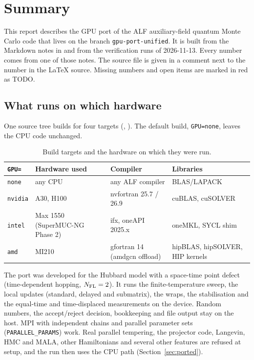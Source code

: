 \section{Summary}

This report describes the GPU port of the ALF auxiliary-field quantum Monte Carlo code that lives on the branch \texttt{gpu-port-unified}. It is built from the Markdown notes in  and from the verification runs of 2026-11-13. Every number comes from one of those notes. The source file is given in a comment next to the number in the \LaTeX{} source. Missing numbers and open items are marked in red as TODO.

\subsection*{What runs on which hardware}

One source tree builds for four targets (, ). The default build, \texttt{GPU=none}, leaves the CPU code unchanged.

\begin{table}[h]
\centering
\caption{Build targets and the hardware on which they were run.}
\label{tab:targets}
\begin{tabular}{@{}lp{4.6cm}p{3.6cm}p{4.2cm}@{}}
\toprule
\texttt{GPU=} & Hardware used & Compiler & Libraries \\
\midrule
\texttt{none} & any CPU & any ALF compiler & BLAS/LAPACK \\ %
\texttt{nvidia} & A30, H100 & nvfortran 25.7 / 26.9 & cuBLAS, cuSOLVER \\ %
\texttt{intel} & Max 1550 (SuperMUC-NG Phase 2) & ifx, oneAPI 2025.x & oneMKL, SYCL shim \\ %
\texttt{amd} & MI210 & gfortran 14 (amdgcn offload) & hipBLAS, hipSOLVER, HIP kernels \\ %
\bottomrule
\end{tabular}
\end{table}

The port was developed for the Hubbard model with a space-time point defect (time-dependent hopping, $N_{\rm FL}=2$). It runs the finite-temperature sweep, the local updates (standard, delayed and submatrix), the wraps, the stabilisation and the equal-time and time-displaced measurements on the device. Random numbers, the accept/reject decision, bookkeeping and file output stay on the host. MPI with independent chains and parallel parameter sets (\texttt{PARALLEL\_PARAMS}) work. Real parallel tempering, the projector code, Langevin, HMC and MALA, other Hamiltonians and several other features are refused at setup, and the run then uses the CPU path (Section~\ref{sec:ported}).


